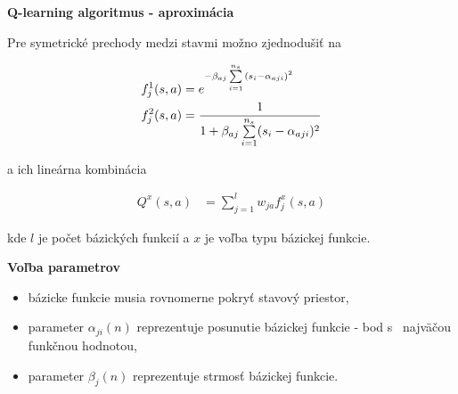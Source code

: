 \documentclass[xcolor=dvipsnames]{beamer}
\begin{document}
\begin{frame}{\bf Q-learning algoritmus - aproximácia}

Pre symetrické prechody medzi stavmi možno zjednodušiť na

\begin{align*}
f_j^1(\boldmath{s, a}) &= e^{ -\beta_{aj} \sum\limits_{i=1}^{n_s}{(s_i - \alpha_{aji})^2} }  \\
f_j^2(\boldmath{s, a}) &= \frac{1}{1 + {\beta_{aj} \sum\limits_{i=1}^{n_s}(s_i - \alpha_{aji})^2}}  \\
\end{align*}

a ich lineárna kombinácia

\begin{align}
    Q^x(s, a)&= \sum\limits_{j=1}^{l}w_{j a}f^x_{j}(s, a) \nonumber
\end{align}

kde $l$ je počet bázických funkcií a $x$ je voľba typu bázickej funkcie.



\end{frame}


\begin{frame}{\bf Voľba parametrov}

\begin{itemize}
\item bázicke funkcie musia rovnomerne pokryť stavový priestor,
\item parameter $\alpha_{ji}(n)$ reprezentuje posunutie bázickej funkcie - bod s~ najväčou funkčnou hodnotou,
\item parameter $\beta_{j}(n)$ reprezentuje strmosť bázickej funkcie.
\end{itemize}

\end{frame}
\end{document}
